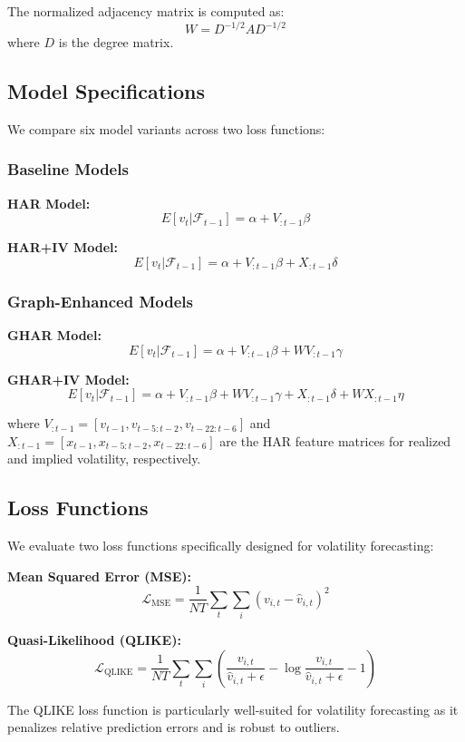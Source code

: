 \documentclass[12pt,a4paper]{article}
\begin{document}
The normalized adjacency matrix is computed as:
$$W = D^{-1/2} A D^{-1/2}$$
where $D$ is the degree matrix.

\subsection{Model Specifications}

We compare six model variants across two loss functions:

\subsubsection{Baseline Models}

\textbf{HAR Model:}
$$E[v_t|\mathcal{F}_{t-1}] = \alpha + V_{:t-1}\beta$$

\textbf{HAR+IV Model:}
$$E[v_t|\mathcal{F}_{t-1}] = \alpha + V_{:t-1}\beta + X_{:t-1}\delta$$

\subsubsection{Graph-Enhanced Models}

\textbf{GHAR Model:}
$$E[v_t|\mathcal{F}_{t-1}] = \alpha + V_{:t-1}\beta + WV_{:t-1}\gamma$$

\textbf{GHAR+IV Model:}
$$E[v_t|\mathcal{F}_{t-1}] = \alpha + V_{:t-1}\beta + WV_{:t-1}\gamma + X_{:t-1}\delta + WX_{:t-1}\eta$$

where $V_{:t-1} = [v_{t-1}, v_{t-5:t-2}, v_{t-22:t-6}]$ and $X_{:t-1} = [x_{t-1}, x_{t-5:t-2}, x_{t-22:t-6}]$ are the HAR feature matrices for realized and implied volatility, respectively.

\subsection{Loss Functions}

We evaluate two loss functions specifically designed for volatility forecasting:

\textbf{Mean Squared Error (MSE):}
$$\mathcal{L}_{\text{MSE}} = \frac{1}{NT}\sum_{t}\sum_{i} (v_{i,t} - \hat{v}_{i,t})^2$$

\textbf{Quasi-Likelihood (QLIKE):}
$$\mathcal{L}_{\text{QLIKE}} = \frac{1}{NT}\sum_{t}\sum_{i}\left(\frac{v_{i,t}}{\hat{v}_{i,t}+\epsilon} - \log\frac{v_{i,t}}{\hat{v}_{i,t}+\epsilon} - 1\right)$$

The QLIKE loss function is particularly well-suited for volatility forecasting as it penalizes relative prediction errors and is robust to outliers.
\end{document}
